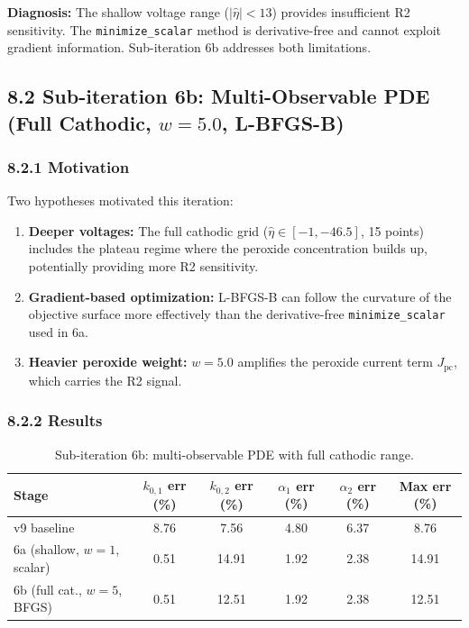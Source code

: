 \documentclass[11pt]{article}
\begin{document}
\textbf{Diagnosis:} The shallow voltage range ($|\hat\eta| < 13$) provides
insufficient R2 sensitivity.  The \texttt{minimize\_scalar} method is
derivative-free and cannot exploit gradient information.  Sub-iteration 6b
addresses both limitations.

\subsection*{8.2 Sub-iteration 6b: Multi-Observable PDE (Full Cathodic, $w = 5.0$, L-BFGS-B)}

\subsubsection*{8.2.1 Motivation}

Two hypotheses motivated this iteration:
\begin{enumerate}
  \item \textbf{Deeper voltages:} The full cathodic grid ($\hat\eta \in [-1,
        -46.5]$, 15 points) includes the plateau regime where the peroxide
        concentration builds up, potentially providing more R2 sensitivity.
  \item \textbf{Gradient-based optimization:} L-BFGS-B can follow the curvature
        of the objective surface more effectively than the derivative-free
        \texttt{minimize\_scalar} used in 6a.
  \item \textbf{Heavier peroxide weight:} $w = 5.0$ amplifies the peroxide
        current term $J_{\text{pc}}$, which carries the R2 signal.
\end{enumerate}

\subsubsection*{8.2.2 Results}

\begin{table}[H]
  \centering
  \caption{Sub-iteration 6b: multi-observable PDE with full cathodic range.}
  \label{tab:s6b}
  \begin{tabular}{l S[round-precision=2] S[round-precision=2]
                    S[round-precision=2] S[round-precision=2]
                    S[round-precision=2]}
    \toprule
    Stage & {$k_{0,1}$ err (\%)} & {$k_{0,2}$ err (\%)}
          & {$\alpha_1$ err (\%)} & {$\alpha_2$ err (\%)}
          & {Max err (\%)} \\
    \midrule
    v9 baseline                   &  8.76 &  7.56 & 4.80 & 6.37 &  8.76 \\
    6a (shallow, $w{=}1$, scalar) &  0.51 & 14.91 & 1.92 & 2.38 & 14.91 \\
    6b (full cat., $w{=}5$, BFGS) &  0.51 & 12.51 & 1.92 & 2.38 & 12.51 \\
    \bottomrule
  \end{tabular}
\end{table}
\end{document}
